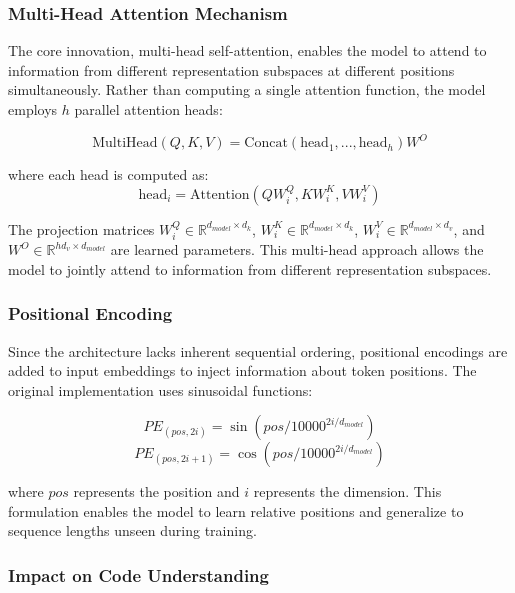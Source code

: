 \documentclass[%
thesis=student,%
coverpage=false,%
titlepage=false,%
headmarks=true, %
english,%
font=libertine, %
math=newpxtx, %
BCOR=5mm,%
coverBCOR=11mm%
]{tum-templates/book/tumbook}
\begin{document}
\subsubsection{Multi-Head Attention Mechanism}

The core innovation, multi-head self-attention, enables the model to attend to information from different representation subspaces at different positions simultaneously. Rather than computing a single attention function, the model employs $h$ parallel attention heads:

\begin{equation}
    \text{MultiHead}(Q,K,V) = \text{Concat}(\text{head}_1, ..., \text{head}_h)W^O
\end{equation}

where each head is computed as:
\begin{equation}
    \text{head}_i = \text{Attention}(QW_i^Q, KW_i^K, VW_i^V)
\end{equation}

The projection matrices $W_i^Q \in \mathbb{R}^{d_{model} \times d_k}$, $W_i^K \in \mathbb{R}^{d_{model} \times d_k}$, $W_i^V \in \mathbb{R}^{d_{model} \times d_v}$, and $W^O \in \mathbb{R}^{hd_v \times d_{model}}$ are learned parameters. This multi-head approach allows the model to jointly attend to information from different representation subspaces.

\subsubsection{Positional Encoding}

Since the architecture lacks inherent sequential ordering, positional encodings are added to input embeddings to inject information about token positions. The original implementation uses sinusoidal functions:

\begin{equation}
    PE_{(pos,2i)} = \sin(pos/10000^{2i/d_{model}})
\end{equation}
\begin{equation}
    PE_{(pos,2i+1)} = \cos(pos/10000^{2i/d_{model}})
\end{equation}

where $pos$ represents the position and $i$ represents the dimension. This formulation enables the model to learn relative positions and generalize to sequence lengths unseen during training.

\subsubsection{Impact on Code Understanding}
\end{document}
